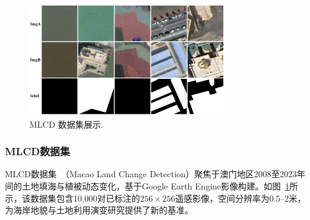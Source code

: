 \begin{figure}[!htb]
  \centering
  \includegraphics[width=0.75\textwidth]{paper_figures/变化检测任务与实验方法介绍/mlcd.png}
  \caption{MLCD 数据集展示.}
  \label{fig:mlcd}
\end{figure}

\subsubsection{MLCD数据集}
MLCD数据集~\cite{Huang2025SAMBasedEF}（Macao Land Change Detection）聚焦于澳门地区2008至2023年间的土地填海与植被动态变化，基于Google Earth Engine影像构建。如图~\ref{fig:mlcd}所示，该数据集包含10,000对已标注的$256\times256$遥感影像，空间分辨率为0.5–2米，为海岸地貌与土地利用演变研究提供了新的基准。


